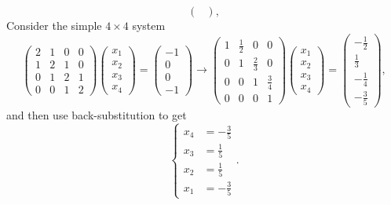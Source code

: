 \documentclass{beamer}
\begin{document}
\begin{frame}
\begin{overlayarea}{\textwidth}{0.8\textheight}
{\begin{equation*}
\begin{pmatrix}
        \end{pmatrix},
      \end{equation*}
    }
    {
      Consider the simple $4 \times 4$ system
      \begin{equation*}
        \begin{pmatrix}
          2 & 1 & 0 & 0 \\
          1 & 2 & 1 & 0 \\
          0 & 1 & 2 & 1 \\
          0 & 0 & 1 & 2
        \end{pmatrix}
        \begin{pmatrix}
          x_1 \\ x_2 \\ x_3 \\ x_4
        \end{pmatrix}
        =
        \begin{pmatrix}
          -1 \\ 0 \\ 0 \\ -1
        \end{pmatrix}
        \rightarrow
        \begin{pmatrix}
          1 & \tfrac{1}{2} & 0 & 0 \\
          0 & 1 & \frac{2}{3} & 0 \\
          0 & 0 & 1 & \tfrac{3}{4} \\
          0 & 0 & 0 & 1
        \end{pmatrix}
        \begin{pmatrix}
          x_1 \\ x_2 \\ x_3 \\ x_4
        \end{pmatrix}
        =
        \begin{pmatrix}
          -\tfrac{1}{2} \\ \tfrac{1}{3} \\ -\tfrac{1}{4} \\ -\tfrac{3}{5}
        \end{pmatrix},        
      \end{equation*}
      and then use back-substitution to get
      \begin{equation*}
        \left\{
          \begin{aligned}
            x_4 & =-\tfrac{3}{5} \\
            x_3 & = \tfrac{1}{5} \\
            x_2 & = \tfrac{1}{5} \\
            x_1 & =-\tfrac{3}{5}
          \end{aligned} \right. .
      \end{equation*}
    }
  \end{overlayarea}
  
\end{frame}
\end{document}
